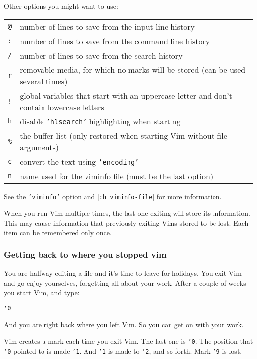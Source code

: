 Other options you might want to use:
\begin{center} \begin{longtable}{c l}
				\texttt{@} & number of lines to save from the input line history \\
				\texttt{:} & number of lines to save from the command line history \\
				\texttt{/} & number of lines to save from the search history \\
				\texttt{r} & removable media, for which no marks will be stored (can be used several times) \\
				\texttt{!} & global variables that start with an uppercase letter and don't contain lowercase letters \\
				\texttt{h} & disable \texttt{'hlsearch'} highlighting when starting \\
				\texttt{\%} & the buffer list (only restored when starting Vim without file arguments) \\
				\texttt{c} & convert the text using \texttt{'encoding'} \\
				\texttt{n} & name used for the viminfo file (must be the last option) \\
\end{longtable} \end{center}

See the \texttt{'viminfo'} option and |\texttt{:h viminfo-file}| for more information.

When you run Vim multiple times, the last one exiting will store its information.
This may cause information that previously exiting Vims stored to be lost.
Each item can be remembered only once.

\subsubsection{Getting back to where you stopped vim}
You are halfway editing a file and it's time to leave for holidays.
You exit Vim and go enjoy yourselves, forgetting all about your work.
After a couple of weeks you start Vim, and type:

\begin{Verbatim}[samepage=true]
 '0
\end{Verbatim}

And you are right back where you left Vim.
So you can get on with your work.

Vim creates a mark each time you exit Vim.
The last one is \texttt{'0}.
The position that \texttt{'0} pointed to is made \texttt{'1}.
And \texttt{'1} is made to \texttt{'2}, and so forth.
Mark \texttt{'9} is lost.

